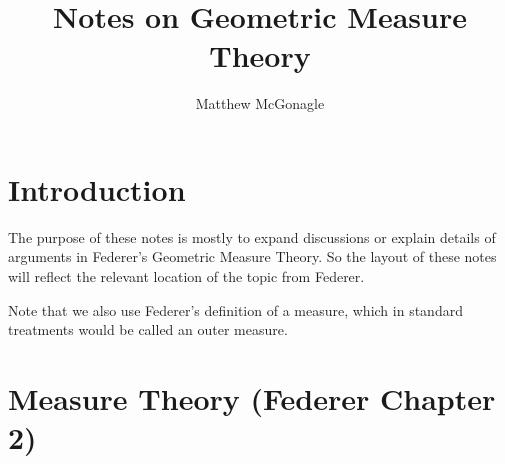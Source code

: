 \documentclass{article}
\begin{document}
\title{Notes on Geometric Measure Theory}
\author{Matthew McGonagle}
\maketitle
\section{Introduction}
The purpose of these notes is mostly to expand discussions or explain details of arguments
in Federer's Geometric Measure Theory. So the layout of these notes will reflect the relevant location
of the topic from Federer.

Note that we also use Federer's definition of a measure, which in standard treatments would be called
an outer measure.

\section{Measure Theory (Federer Chapter 2)}



\end{document}
